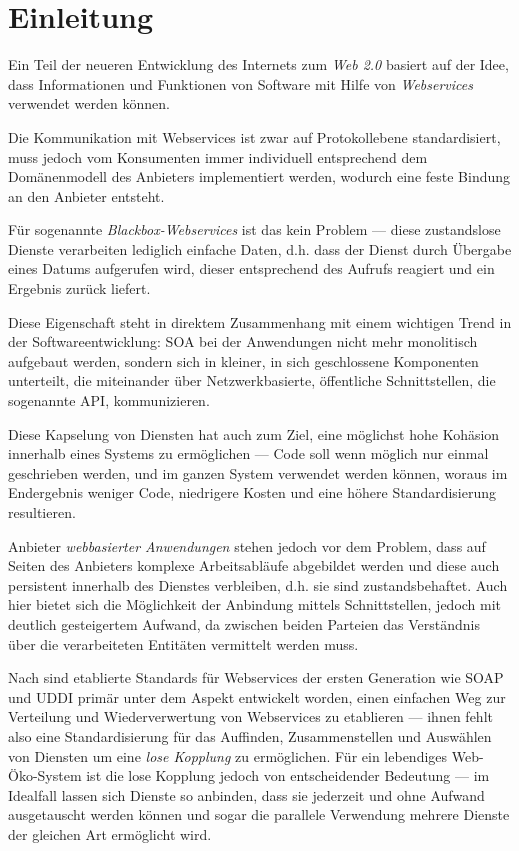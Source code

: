 \section{Einleitung}
\label{l:einleitung}

Ein Teil der neueren Entwicklung des Internets zum \emph{Web 2.0} basiert auf der Idee, dass Informationen und Funktionen von Software mit Hilfe von \emph{Webservices} verwendet werden können.

Die Kommunikation mit Webservices ist zwar auf Protokollebene standardisiert, muss jedoch vom Konsumenten immer individuell entsprechend dem Domänenmodell des Anbieters implementiert werden, wodurch eine feste Bindung an den Anbieter entsteht. \cite{ka-cots}

Für sogenannte \emph{Blackbox-Webservices} ist das kein Problem --- diese zustandslose Dienste verarbeiten lediglich einfache Daten, d.h. dass der Dienst durch Übergabe eines Datums aufgerufen wird, dieser entsprechend des Aufrufs reagiert und ein Ergebnis zurück liefert.

Diese Eigenschaft steht in direktem Zusammenhang mit einem wichtigen Trend in der Softwareentwicklung: \ac{SOA} bei der Anwendungen nicht mehr monolitisch aufgebaut werden, sondern sich in kleiner, in sich geschlossene Komponenten unterteilt, die miteinander über Netzwerkbasierte, öffentliche Schnittstellen, die sogenannte \ac{API}, kommunizieren.

Diese Kapselung von Diensten hat auch zum Ziel, eine möglichst hohe Kohäsion innerhalb eines Systems zu ermöglichen --- Code soll wenn möglich nur einmal geschrieben werden, und im ganzen System verwendet werden können, woraus im Endergebnis weniger Code, niedrigere Kosten und eine höhere Standardisierung resultieren. \cite{hn-web20}


Anbieter \emph{webbasierter Anwendungen} stehen jedoch vor dem Problem, dass auf Seiten des Anbieters komplexe Arbeitsabläufe abgebildet werden und diese auch persistent innerhalb des Dienstes verbleiben, d.h. sie sind zustandsbehaftet. Auch hier bietet sich die Möglichkeit der Anbindung mittels Schnittstellen, jedoch mit deutlich gesteigertem Aufwand, da zwischen beiden Parteien das Verständnis über die verarbeiteten 
Entitäten vermittelt werden muss. 

Nach \cite[Seite 653]{ei-sawsdl} sind etablierte Standards für Webservices der ersten Generation wie \ac{SOAP} und \ac{UDDI} primär unter dem Aspekt entwickelt worden, einen einfachen Weg zur Verteilung und Wiederverwertung von Webservices zu etablieren --- ihnen fehlt also eine Standardisierung für das Auffinden, Zusammenstellen und Auswählen von Diensten um eine \emph{lose Kopplung} zu ermöglichen. Für ein lebendiges Web-Öko-System ist die lose Kopplung jedoch von entscheidender Bedeutung --- im Idealfall lassen sich Dienste so anbinden, dass sie jederzeit und ohne Aufwand ausgetauscht werden können und sogar die parallele Verwendung mehrere Dienste der gleichen Art ermöglicht wird.  

